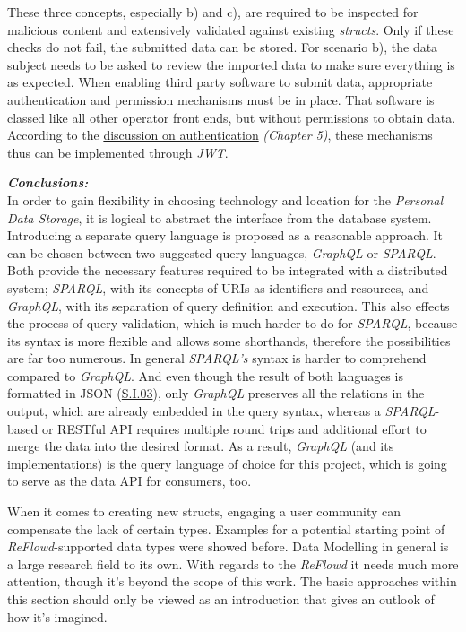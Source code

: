 \documentclass[12pt,english,a4paper,titlepage,cleardoublepage=empty,dottedtoc]{report}
\begin{document}
These three concepts, especially b) and c), are required to be inspected
for malicious content and extensively validated against existing
\emph{structs}. Only if these checks do not fail, the submitted data can
be stored. For scenario b), the data subject needs to be asked to review
the imported data to make sure everything is as expected. When enabling
third party software to submit data, appropriate authentication and
permission mechanisms must be in place. That software is classed like
all other operator front ends, but without permissions to obtain data.
According to the \protect\hyperlink{authentication}{discussion on
authentication} \emph{(Chapter 5)}, these mechanisms thus can be
implemented through \emph{JWT}.

\emph{\textbf{Conclusions:}} ~\\
In order to gain flexibility in choosing technology and location for the
\emph{Personal Data Storage}, it is logical to abstract the interface
from the database system. Introducing a separate query language is
proposed as a reasonable approach. It can be chosen between two
suggested query languages, \emph{GraphQL} or \emph{SPARQL}. Both provide
the necessary features required to be integrated with a distributed
system; \emph{SPARQL}, with its concepts of URIs as identifiers and
resources, and \emph{GraphQL}, with its separation of query definition
and execution. This also effects the process of query validation, which
is much harder to do for \emph{SPARQL}, because its syntax is more
flexible and allows some shorthands, therefore the possibilities are far
too numerous. In general \emph{SPARQL's} syntax is harder to comprehend
compared to \emph{GraphQL}. And even though the result of both languages
is formatted in JSON (\protect\hyperlink{si03}{S.I.03}), only
\emph{GraphQL} preserves all the relations in the output, which are
already embedded in the query syntax, whereas a \emph{SPARQL}-based or
RESTful API requires multiple round trips and additional effort to merge
the data into the desired format. As a result, \emph{GraphQL} (and its
implementations) is the query language of choice for this project, which
is going to serve as the data API for consumers, too.

When it comes to creating new structs, engaging a user community can
compensate the lack of certain types. Examples for a potential starting
point of \emph{ReFlowd}-supported data types were showed before. Data
Modelling in general is a large research field to its own. With regards
to the \emph{ReFlowd} it needs much more attention, though it's beyond
the scope of this work. The basic approaches within this section should
only be viewed as an introduction that gives an outlook of how it's
imagined.
\end{document}
